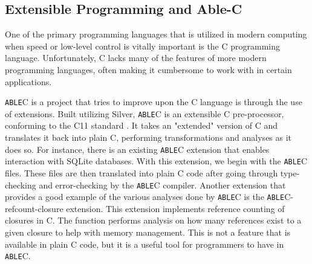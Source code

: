 \documentclass[main.tex]{subfiles}
\begin{document}
\subsection{Extensible Programming and Able-C}
One of the primary programming languages that is utilized in modern computing
when speed or low-level control is vitally important is the C programming
language. Unfortunately, C lacks many of the features of more modern programming
languages, often making it cumbersome to work with in certain applications.

\verb|ABLE|C \cite{9} is a project that tries to improve upon the C language is through the use
of extensions. Built utilizing Silver, \verb|ABLE|C is an 
extensible C pre-processor, conforming to the C11 standard \cite{8}. It takes an
"extended" version of C and translates it back into plain C, performing
transformations and analyses as it does so. For instance, there is an existing %
\verb|ABLE|C extension that enables interaction with SQLite databases. With this
extension, we begin with the \verb|ABLE|C files. These files are then translated
into plain C code after going through type-checking and error-checking by the
\verb|ABLE|C compiler. %
Another extension that provides a good example of the various analyses done by
\verb|ABLE|C is the \verb|ABLE|C-refcount-closure extension. This extension
implements reference counting of closures in C. The function performs analysis
on how many references exist to a given closure to help with memory management.
This is not a feature that is available in plain C code, but it is a useful tool for
programmers to have in \verb|ABLE|C.
\end{document}
